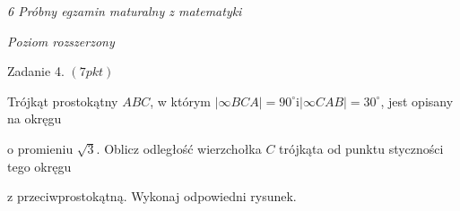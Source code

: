 \documentclass[a4paper,12pt]{article}
\begin{document}
{\it 6 Próbny egzamin maturalny z matematyki}

{\it Poziom rozszerzony}

Zadanie 4. $(7pkt)$

Trójkąt prostokątny $ABC$, w którym $|\infty BCA|=90^{\circ} \mathrm{i} |\infty CAB|=30^{\circ}$, jest opisany na okręgu

o promieniu $\sqrt{3}$. Oblicz odległość wierzchołka $C$ trójkąta od punktu styczności tego okręgu

z przeciwprostokątną. Wykonaj odpowiedni rysunek.
\end{document}
